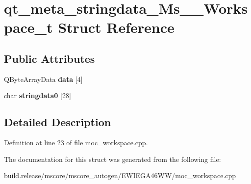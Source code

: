 \hypertarget{structqt__meta__stringdata___ms_____workspace__t}{}\section{qt\+\_\+meta\+\_\+stringdata\+\_\+\+Ms\+\_\+\+\_\+\+Workspace\+\_\+t Struct Reference}
\label{structqt__meta__stringdata___ms_____workspace__t}
\subsection*{Public Attributes}
\begin{DoxyCompactItemize}
\item 
\mbox{\label{structqt__meta__stringdata___ms_____workspace__t_ae31354869603ae157b427997bdc585d0}} 
Q\+Byte\+Array\+Data {\bfseries data} \mbox{[}4\mbox{]}
\item 
\mbox{\label{structqt__meta__stringdata___ms_____workspace__t_a77cd23ae2eaacbbb273d695f24a6d761}} 
char {\bfseries stringdata0} \mbox{[}28\mbox{]}
\end{DoxyCompactItemize}


\subsection{Detailed Description}


Definition at line 23 of file moc\+\_\+workspace.\+cpp.



The documentation for this struct was generated from the following file\+:\begin{DoxyCompactItemize}
\item 
build.\+release/mscore/mscore\+\_\+autogen/\+E\+W\+I\+E\+G\+A46\+W\+W/moc\+\_\+workspace.\+cpp\end{DoxyCompactItemize}

